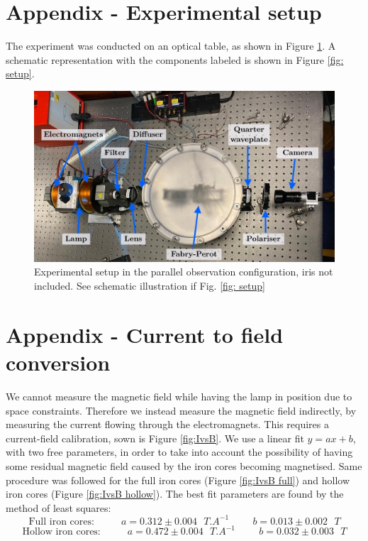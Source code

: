 \documentclass[11pt]{article}
\begin{document}
\section{Appendix - Experimental setup} \label{sec: app setup}
The experiment was conducted on an optical table, as shown in Figure \ref{fig: setup photo}. A schematic representation with the components labeled is shown in Figure \ref{fig: setup}. 
\begin{figure}[h!]
    \centering
    \includegraphics[width=0.65\linewidth]{setup photo.jpeg}
    \captionsetup{justification=centering}
    \caption{Experimental setup in the parallel observation configuration, iris not included. See schematic illustration if Fig. \ref{fig: setup}}
    \label{fig: setup photo}
\end{figure}

\section{Appendix - Current to field conversion}
We cannot measure the magnetic field while having the lamp in position due to space constraints. Therefore we instead measure the magnetic field indirectly, by measuring the current flowing through the electromagnets. This requires a current-field calibration, sown is Figure \ref{fig:IvsB}. We use a linear fit $y = a x + b$, with two free parameters, in order to take into account the possibility of having some residual magnetic field caused by the iron cores becoming magnetised. Same procedure was followed for the full iron cores (Figure \ref{fig:IvsB full}) and hollow iron cores (Figure \ref{fig:IvsB hollow}). The best fit parameters are found by the method of least squares: 
\begin{equation}
	\text{Full iron cores: }
	\hspace {1cm} 
	a = 0.312 \pm 0.004  \text{ } \si{T.A^{-1}} 
	\hspace {1cm} 
	b = 0.013 \pm 0.002 \text{ }  \si{T} 
\end{equation}
\begin{equation}
	\text{Hollow iron cores: }
	\hspace {1cm} 
	a = 0.472 \pm 0.004  \text{ } \si{T.A^{-1}} 
	\hspace {1cm} 
	b = 0.032 \pm 0.003  \text{ } \si{T} 
\end{equation}
\end{document}

